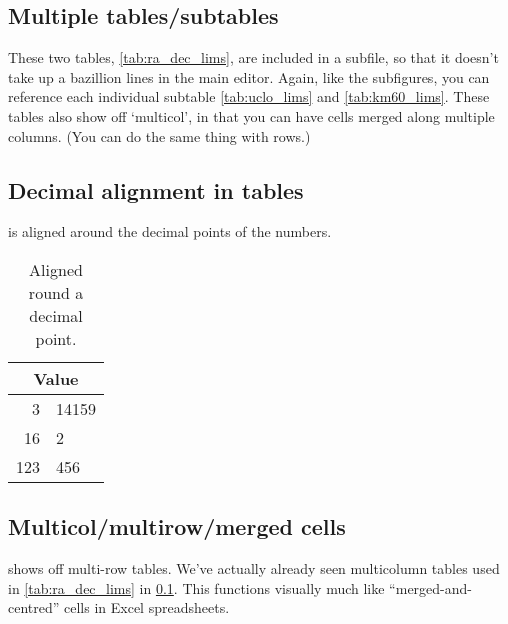 \documentclass[../main]{subfiles}
\begin{document}
\subsection{Multiple tables/subtables}\label{sub:subtables}

These two tables, \cref{tab:ra_dec_lims}, are included in a subfile, so that it doesn't take up a bazillion lines in the main editor. Again, like the subfigures, you can reference each individual subtable \cref{tab:uclo_lims} and \cref{tab:km60_lims}. These tables also show off `multicol', in that you can have cells merged along multiple columns. (You can do the same thing with rows.)




\subsection{Decimal alignment in tables}

 is aligned around the decimal points of the numbers.

\begin{table}[htbp]
\centering
    \begin{tabular}{r@{.}l}
    \toprule
    \multicolumn{2}{c}{Value} \\
    \midrule
    3   & 14159 \\
    16  & 2     \\
    123 & 456   \\
    \bottomrule
    \end{tabular}
\caption{Aligned round a decimal point.}
\label{tab:decimals}
\end{table}

\subsection{Multicol/multirow/merged cells}\label{sub:merged_cells}

 shows off multi-row tables. We've actually already seen multicolumn tables used in \cref{tab:ra_dec_lims} in \cref{sub:subtables}. This functions visually much like ``merged-and-centred'' cells in Excel spreadsheets.
\end{document}
